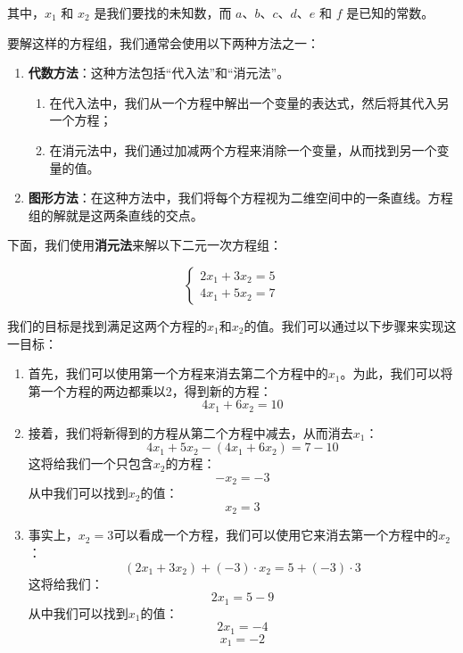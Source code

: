 其中，\(x_1\) 和 \(x_2\) 是我们要找的未知数，而 \(a\)、\(b\)、\(c\)、\(d\)、\(e\) 和 \(f\) 是已知的常数。

要解这样的方程组，我们通常会使用以下两种方法之一：
\begin{enumerate}
    \item \textbf{代数方法}：这种方法包括“代入法”和“消元法”。
    \begin{enumerate}
        \item 在代入法中，我们从一个方程中解出一个变量的表达式，然后将其代入另一个方程；
        \item 在消元法中，我们通过加减两个方程来消除一个变量，从而找到另一个变量的值。
    \end{enumerate}
    \item \textbf{图形方法}：在这种方法中，我们将每个方程视为二维空间中的一条直线。方程组的解就是这两条直线的交点。
\end{enumerate}


下面，我们使用\textbf{消元法}来解以下二元一次方程组：

\begin{equation}
    \left\{
        \begin{array}{l}
        2x_1 + 3x_2 = 5\\
        4x_1 + 5x_2 = 7
        \end{array}
        \right.
\label{eq:二元一次方程组示例}
\end{equation}

我们的目标是找到满足这两个方程的\(x_1\)和\(x_2\)的值。我们可以通过以下步骤来实现这一目标：

\begin{enumerate}
    \item 首先，我们可以使用第一个方程来消去第二个方程中的\(x_1\)。为此，我们可以将第一个方程的两边都乘以2，得到新的方程：
    \[
    4x_1 + 6x_2 = 10
    \]
    \item 接着，我们将新得到的方程从第二个方程中减去，从而消去\(x_1\)：
    \[
    4x_1 + 5x_2 - (4x_1 + 6x_2) = 7 - 10
    \]
    这将给我们一个只包含\(x_2\)的方程：
    \[
    -x_2 = -3
    \]
    从中我们可以找到\(x_2\)的值：
    \[
    x_2 = 3
    \]
    \item 事实上，\(x_2 = 3\)可以看成一个方程，我们可以使用它来消去第一个方程中的\(x_2\)：
    \[
    (2x_1 + 3x_2) + (-3) \cdot x_2 = 5 + (-3) \cdot 3
    \]
    这将给我们：
    \[
    2x_1 = 5 - 9
    \]
    从中我们可以找到\(x_1\)的值：
    \[
    2x_1 = -4
    \]
    \[
    x_1 = -2
    \]
\end{enumerate}

